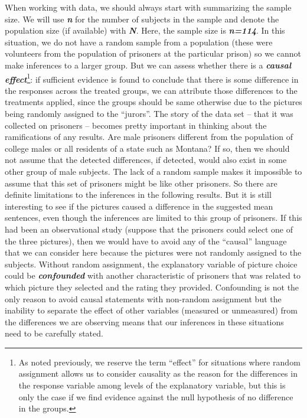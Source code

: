 \documentclass[]{book}
\let\rmarkdownfootnote\footnote%
\def\footnote{\protect\rmarkdownfootnote}
\begin{document}
When working with data, we should always start with summarizing the
sample size. We will use \textbf{\emph{n}} for the number of subjects in
the sample and denote the population size (if available) with
\textbf{\emph{N}}. Here, the sample size is \textbf{\emph{n=114}}. In
this situation, we do not have a random sample from a population (these
were volunteers from the population of prisoners at the particular
prison) so we cannot make inferences to a larger group. But we can
assess whether there is a \textbf{\emph{causal effect}}\footnote{As
  noted previously, we reserve the term ``effect'' for situations where
  random assignment allows us to consider causality as the reason for
  the differences in the response variable among levels of the
  explanatory variable, but this is only the case if we find evidence
  against the null hypothesis of no difference in the groups.}: if
sufficient evidence is found to conclude that there is some difference
in the responses across the treated groups, we can attribute those
differences to the treatments applied, since the groups should be same
otherwise due to the pictures being randomly assigned to the ``jurors''.
The story of the data set -- that it was collected on prisoners --
becomes pretty important in thinking about the ramifications of any
results. Are male prisoners different from the population of college
males or all residents of a state such as Montana? If so, then we should
not assume that the detected differences, if detected, would also exist
in some other group of male subjects. The lack of a random sample makes
it impossible to assume that this set of prisoners might be like other
prisoners. So there are definite limitations to the inferences in the
following results. But it is still interesting to see if the pictures
caused a difference in the suggested mean sentences, even though the
inferences are limited to this group of prisoners. If this had been an
observational study (suppose that the prisoners could select one of the
three pictures), then we would have to avoid any of the ``causal''
language that we can consider here because the pictures were not
randomly assigned to the subjects. Without random assignment, the
explanatory variable of picture choice could be
\textbf{\emph{confounded}} with another characteristic of prisoners that
was related to which picture they selected and the rating they provided.
Confounding is not the only reason to avoid causal statements with
non-random assignment but the inability to separate the effect of other
variables (measured or unmeasured) from the differences we are observing
means that our inferences in these situations need to be carefully
stated.
\end{document}
